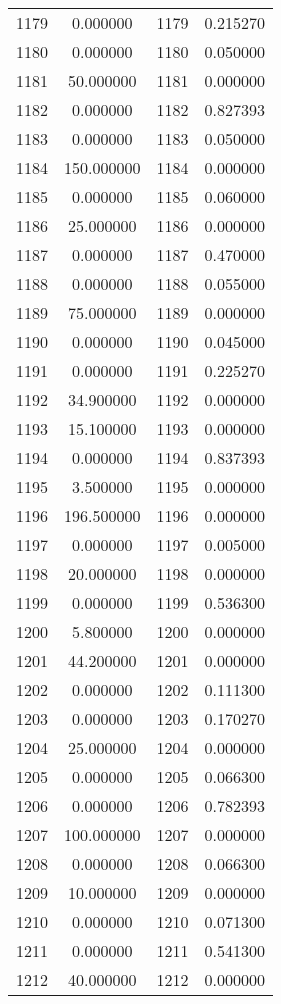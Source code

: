 \documentclass[12pt]{article}
\begin{document}
\begin{longtable}{@{}cccc@{}}
1179 & 0.000000 & 1179 & 0.215270 \\
1180 & 0.000000 & 1180 & 0.050000 \\
1181 & 50.000000 & 1181 & 0.000000 \\
1182 & 0.000000 & 1182 & 0.827393 \\
1183 & 0.000000 & 1183 & 0.050000 \\
1184 & 150.000000 & 1184 & 0.000000 \\
1185 & 0.000000 & 1185 & 0.060000 \\
1186 & 25.000000 & 1186 & 0.000000 \\
1187 & 0.000000 & 1187 & 0.470000 \\
1188 & 0.000000 & 1188 & 0.055000 \\
1189 & 75.000000 & 1189 & 0.000000 \\
1190 & 0.000000 & 1190 & 0.045000 \\
1191 & 0.000000 & 1191 & 0.225270 \\
1192 & 34.900000 & 1192 & 0.000000 \\
1193 & 15.100000 & 1193 & 0.000000 \\
1194 & 0.000000 & 1194 & 0.837393 \\
1195 & 3.500000 & 1195 & 0.000000 \\
1196 & 196.500000 & 1196 & 0.000000 \\
1197 & 0.000000 & 1197 & 0.005000 \\
1198 & 20.000000 & 1198 & 0.000000 \\
1199 & 0.000000 & 1199 & 0.536300 \\
1200 & 5.800000 & 1200 & 0.000000 \\
1201 & 44.200000 & 1201 & 0.000000 \\
1202 & 0.000000 & 1202 & 0.111300 \\
1203 & 0.000000 & 1203 & 0.170270 \\
1204 & 25.000000 & 1204 & 0.000000 \\
1205 & 0.000000 & 1205 & 0.066300 \\
1206 & 0.000000 & 1206 & 0.782393 \\
1207 & 100.000000 & 1207 & 0.000000 \\
1208 & 0.000000 & 1208 & 0.066300 \\
1209 & 10.000000 & 1209 & 0.000000 \\
1210 & 0.000000 & 1210 & 0.071300 \\
1211 & 0.000000 & 1211 & 0.541300 \\
1212 & 40.000000 & 1212 & 0.000000 \\

\end{longtable}
\end{document}
